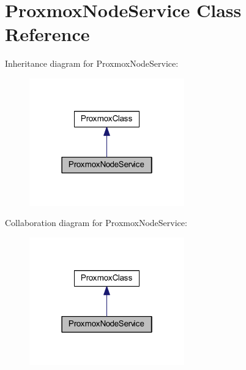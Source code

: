 \hypertarget{class_proxmox_node_service}{}\section{Proxmox\+Node\+Service Class Reference}
\label{class_proxmox_node_service}


Inheritance diagram for Proxmox\+Node\+Service\+:
\nopagebreak
\begin{figure}[H]
\begin{center}
\leavevmode
\includegraphics[width=190pt]{class_proxmox_node_service__inherit__graph}
\end{center}
\end{figure}


Collaboration diagram for Proxmox\+Node\+Service\+:
\nopagebreak
\begin{figure}[H]
\begin{center}
\leavevmode
\includegraphics[width=190pt]{class_proxmox_node_service__coll__graph}
\end{center}
\end{figure}
